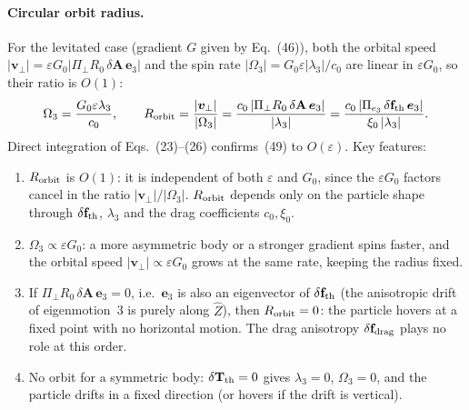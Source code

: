 \documentclass[11pt]{article}
\newcommand{\chg}[1]{\marginpar{\raggedright\footnotesize\textcolor{red!70!black}{\textsf{#1}}}}
\newcommand{\vect}[1]{\bm{#1}}
\begin{document}
\paragraph{Circular orbit radius.} For the levitated case (gradient $G$ given by Eq.~(46)), both the orbital speed $|\vect v_\perp|=\varepsilon G_0|\Pi_\perp R_0\,\delta\mathbf A\,\vect e_3|$ and the spin rate $|\Omega_3|=G_0\varepsilon|\lambda_3|/c_0$ are linear in $\varepsilon G_0$, so their ratio is $O(1)$:
\begin{equation}
  \Omega_3=\frac{G_0\varepsilon\lambda_3}{c_0},\qquad
  R_{\rm orbit}=\frac{|\vect v_\perp|}{|\Omega_3|}=\frac{c_0\,|\Pi_\perp R_0\,\delta\mathbf A\,\vect e_3|}{|\lambda_3|}=\frac{c_0\,|\Pi_{e_3}\,\delta\mathbf f_{\rm th}\,\vect e_3|}{\xi_0\,|\lambda_3|}.
\end{equation}
Direct integration of Eqs.~(23)--(26) confirms~(49) to $O(\varepsilon)$. Key features:
\begin{enumerate}
  \item $R_{\rm orbit}$ is $O(1)$: it is independent of both $\varepsilon$ and $G_0$, since the $\varepsilon G_0$ factors cancel in the ratio $|\vect v_\perp|/|\Omega_3|$. $R_{\rm orbit}$ depends only on the particle shape through $\delta\mathbf f_{\rm th}$, $\lambda_3$ and the drag coefficients $c_0,\xi_0$.
  \item $\Omega_3\propto\varepsilon G_0$: a more asymmetric body or a stronger gradient spins faster, and the orbital speed $|\vect v_\perp|\propto\varepsilon G_0$ grows at the same rate, keeping the radius fixed.
  \item If $\Pi_\perp R_0\,\delta\mathbf A\,\vect e_3=0$, i.e.\ $\vect e_3$ is also an eigenvector of $\delta\mathbf f_{\rm th}$ (the anisotropic drift of eigenmotion~3 is purely along $\hat Z$), then $R_{\rm orbit}=0$: the particle hovers at a fixed point with no horizontal motion. The drag anisotropy $\delta\mathbf f_{\rm drag}$ plays no role at this order.\chg{C13}
  \item No orbit for a symmetric body: $\delta\mathbf T_{\rm th}=0$ gives $\lambda_3=0$, $\Omega_3=0$, and the particle drifts in a fixed direction (or hovers if the drift is vertical).
\end{enumerate}
\end{document}
